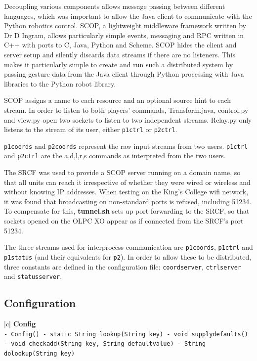 \documentclass[12pt,a4,notitlepage]{report}
\renewcommand{\_}{\texttt{\symbol{95}}}
\newcommand{\<}{\texttt{\symbol{60}}}
\renewcommand{\>}{\texttt{\symbol{62}}}
\newcommand{\class}[1]{\textbf{#1}}
\newcommand{\scopendpoint}[1]{\texttt{#1}}
\newcommand{\variable}[1]{\texttt{#1}}
\begin{document}
Decoupling various components allows message passing between different languages, which was important to allow the Java client to communicate with the Python robotics control. SCOP, a lightweight middleware framework written by Dr D Ingram, allows particularly simple events, messaging and RPC written in C++ with ports to C, Java, Python and Scheme. SCOP hides the client and server setup and silently discards data streams if there are no listeners. This makes it particularly simple to create and run such a distributed system by passing gesture data from the Java client through Python processing with Java libraries to the Python robot library.

SCOP assigns a name to each resource and an optional source hint to each stream. In order to listen to both players' commands, Transform.java, control.py and view.py open two sockets to listen to two independent streams. Relay.py only listens to the stream of its user, either \scopendpoint{p1ctrl} or \scopendpoint{p2ctrl}.

\scopendpoint{p1coords} and \scopendpoint{p2coords} represent the raw input streams from two users.
\scopendpoint{p1ctrl} and \scopendpoint{p2ctrl} are the {a,d,l,r,s} commands as interpreted from the two users.

The SRCF was used to provide a SCOP server running on a domain name, so that all units can reach it irrespective of whether they were wired or wireless and without knowing IP addresses. When testing on the King's College wifi network, it was found that broadcasting on non-standard ports is refused, including 51234. To compensate for this, \class{tunnel.sh} sets up port forwarding to the SRCF, so that sockets opened on the OLPC XO appear as if connected from the SRCF's port 51234.

The three streams used for interprocess communication are \scopendpoint{p1coords}, \scopendpoint{p1ctrl} and \scopendpoint{p1status} (and their equivalents for \scopendpoint{p2}). In order to allow these to be distributed, three constants are defined in the configuration file: \variable{coordserver}, \variable{ctrlserver} and \variable{statusserver}. 

\subsection{Configuration}

\begin{tabular}{|c|} \hline 
\class{Config} \\ \hline
{}
{\variable{- Config() \newline
- static String lookup(String key) \newline
- void supply\_defaults() \newline
- void check\_add(String key, String defaultvalue) \newline
- String do\_lookup(String key)
} } \\ \hline
\end{tabular}
\end{document}
